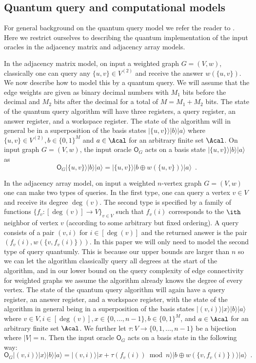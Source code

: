 \setcounter{subsection}{2}
\subsection{Quantum query and computational models}
For general background on the quantum query model we refer the reader to \cite{HLS07}. 
Here we restrict ourselves to describing the quantum 
implementation of the input oracles in the adjacency matrix and adjacency array models.

In the adjacency matrix model, on input a weighted graph $G = (V,w)$, classically one can query any $\{u,v\} \in V^{(2)}$ and receive the answer 
$w(\{u,v\})$.  We now describe how to model this by a quantum query.  We will assume that the 
edge weights are given as binary decimal numbers with $M_1$ bits before the decimal and $M_2$ bits after the decimal for a total of $M = M_1 + M_2$ bits.  
The state of the quantum query 
algorithm will have three registers, a query register, an answer register, and a workspace register.  The 
state of the algorithm will in general be in a superposition of the basis states $|\{u,v\} \rangle |b \rangle | a \rangle$ where $\{u,v\} \in V^{(2)}, b \in \{0,1\}^M$ 
and $a \in \Acal$ for an arbitrary finite set $\Acal$.  
On input graph $G = (V,w)$, the input oracle $\mathsf{O}_G$ acts on a basis state $|\{u,v\} \rangle |b \rangle | a \rangle$ as
\[
\mathsf{O}_G |\{u,v\} \rangle |b \rangle | a \rangle = |\{u,v\} \rangle |b \oplus w(\{u,v\}) \rangle | a \rangle \enspace.
\]
 
In the adjacency array model, on input a weighted $n$-vertex graph $G = (V,w)$ one can make two types of queries.  In the first type, one can query a vertex $v \in V$ and receive its degree $\deg(v)$.
The second type is specified by a family of functions $\{f_v : [\deg(v)] \rightarrow V\}_{v \in V}$ such that $f_v(i)$ corresponds to the $\ith$ neighbor of vertex $v$ (according to some arbitrary but fixed ordering).  
A query consists of a pair $(v,i)$ for $i \in [\deg(v)]$ and the returned answer is the pair
$(f_v(i), w(\{v,f_v(i)\}))$.  In this paper we will only 
need to model the second type of query quantumly.  This is because our upper bounds are larger than $n$ so we can let the algorithm classically 
query all degrees at the start of the algorithm, and in our lower bound on the query complexity of edge connectivity for weighted graphs we assume the 
algorithm already knows the degree of every vertex.  
The state of the quantum query algorithm will again have a query register, an answer register, and a workspace register, with the state of the algorithm 
in general being in a superposition of the basis states $|(v,i)\rangle |x \rangle |b \rangle | a \rangle$ where $v \in V, i \in [\deg(v)], x \in \{0,\ldots, n-1\}, b \in \{0,1\}^M$, 
and $a \in \Acal$ for an arbitrary finite set $\Acal$.  We further let $\tau : V \rightarrow \{0,1,\ldots, n-1\}$ be a bijection where $|V| = n$.  Then the input oracle $\mathsf{O}_G$ acts on a basis state in the following way:
\[
\mathsf{O}_G |(v,i)\rangle |x \rangle |b \rangle | a \rangle = |(v,i) \rangle |x + \tau(f_v(i)) \bmod n \rangle |b \oplus w(\{v,f_v(i)\}) \rangle | a \rangle \enspace.
\]

